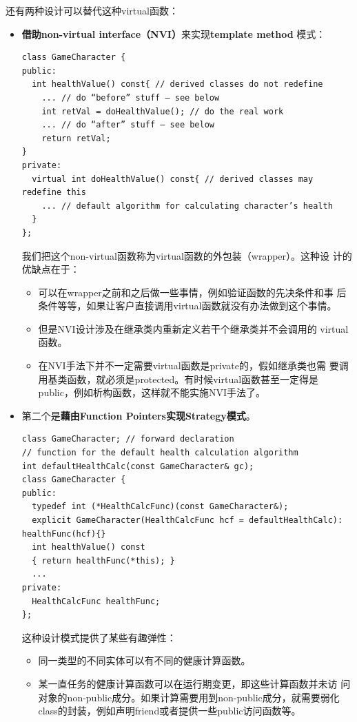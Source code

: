 \documentclass[a4paper,twoside]{article}
\theoremstyle{definition}
\theoremstyle{remark}
\numberwithin{equation}{section}
\begin{document}
还有两种设计可以替代这种virtual函数：
\begin{itemize}
\item \textbf{借助non-virtual interface（NVI）}来实现\textbf{template method}
  模式：
\begin{verbatim}
class GameCharacter {
public:
  int healthValue() const{ // derived classes do not redefine
    ... // do “before” stuff — see below
    int retVal = doHealthValue(); // do the real work
    ... // do “after” stuff — see below
    return retVal;
}
private:
  virtual int doHealthValue() const{ // derived classes may redefine this
    ... // default algorithm for calculating character’s health
  }
};
\end{verbatim}
  我们把这个non-virtual函数称为virtual函数的外包装（wrapper）。这种设
  计的优缺点在于：
  \begin{itemize}
  \item 可以在wrapper之前和之后做一些事情，例如验证函数的先决条件和事
    后条件等等，如果让客户直接调用virtual函数就没有办法做到这个事情。
  \item 但是NVI设计涉及在继承类内重新定义若干个继承类并不会调用的
    virtual函数。
  \item 在NVI手法下并不一定需要virtual函数是private的，假如继承类也需
    要调用基类函数，就必须是protected。有时候virtual函数甚至一定得是
    public，例如析构函数，这样就不能实施NVI手法了。
  \end{itemize}
  
\item 第二个是\textbf{藉由Function Pointers实现Strategy模式}。
\begin{verbatim}
class GameCharacter; // forward declaration
// function for the default health calculation algorithm
int defaultHealthCalc(const GameCharacter& gc);
class GameCharacter {
public:
  typedef int (*HealthCalcFunc)(const GameCharacter&);
  explicit GameCharacter(HealthCalcFunc hcf = defaultHealthCalc): healthFunc(hcf){}
  int healthValue() const
  { return healthFunc(*this); }
  ...
private:
  HealthCalcFunc healthFunc;
};
\end{verbatim}
  这种设计模式提供了某些有趣弹性：
  \begin{itemize}
  \item 同一类型的不同实体可以有不同的健康计算函数。
  \item 某一直任务的健康计算函数可以在运行期变更，即这些计算函数并未访
    问对象的non-public成分。如果计算需要用到non-public成分，就需要弱化
    class的封装，例如声明friend或者提供一些public访问函数等。 
  \end{itemize}


\end{itemize}
\end{document}
